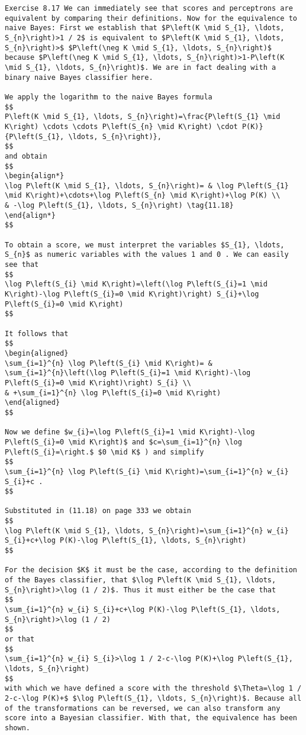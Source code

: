 \documentclass[10pt]{article}
\begin{document}
\begin{verbatim}
Exercise 8.17 We can immediately see that scores and perceptrons are equivalent by comparing their definitions. Now for the equivalence to naive Bayes: First we establish that $P\left(K \mid S_{1}, \ldots, S_{n}\right)>1 / 2$ is equivalent to $P\left(K \mid S_{1}, \ldots, S_{n}\right)>$ $P\left(\neg K \mid S_{1}, \ldots, S_{n}\right)$ because $P\left(\neg K \mid S_{1}, \ldots, S_{n}\right)>1-P\left(K \mid S_{1}, \ldots, S_{n}\right)$. We are in fact dealing with a binary naive Bayes classifier here.

We apply the logarithm to the naive Bayes formula
$$
P\left(K \mid S_{1}, \ldots, S_{n}\right)=\frac{P\left(S_{1} \mid K\right) \cdots \cdots P\left(S_{n} \mid K\right) \cdot P(K)}{P\left(S_{1}, \ldots, S_{n}\right)},
$$
and obtain
$$
\begin{align*}
\log P\left(K \mid S_{1}, \ldots, S_{n}\right)= & \log P\left(S_{1} \mid K\right)+\cdots+\log P\left(S_{n} \mid K\right)+\log P(K) \\
& -\log P\left(S_{1}, \ldots, S_{n}\right) \tag{11.18}
\end{align*}
$$

To obtain a score, we must interpret the variables $S_{1}, \ldots, S_{n}$ as numeric variables with the values 1 and 0 . We can easily see that
$$
\log P\left(S_{i} \mid K\right)=\left(\log P\left(S_{i}=1 \mid K\right)-\log P\left(S_{i}=0 \mid K\right)\right) S_{i}+\log P\left(S_{i}=0 \mid K\right)
$$

It follows that
$$
\begin{aligned}
\sum_{i=1}^{n} \log P\left(S_{i} \mid K\right)= & \sum_{i=1}^{n}\left(\log P\left(S_{i}=1 \mid K\right)-\log P\left(S_{i}=0 \mid K\right)\right) S_{i} \\
& +\sum_{i=1}^{n} \log P\left(S_{i}=0 \mid K\right)
\end{aligned}
$$

Now we define $w_{i}=\log P\left(S_{i}=1 \mid K\right)-\log P\left(S_{i}=0 \mid K\right)$ and $c=\sum_{i=1}^{n} \log P\left(S_{i}=\right.$ $0 \mid K$ ) and simplify
$$
\sum_{i=1}^{n} \log P\left(S_{i} \mid K\right)=\sum_{i=1}^{n} w_{i} S_{i}+c .
$$

Substituted in (11.18) on page 333 we obtain
$$
\log P\left(K \mid S_{1}, \ldots, S_{n}\right)=\sum_{i=1}^{n} w_{i} S_{i}+c+\log P(K)-\log P\left(S_{1}, \ldots, S_{n}\right)
$$

For the decision $K$ it must be the case, according to the definition of the Bayes classifier, that $\log P\left(K \mid S_{1}, \ldots, S_{n}\right)>\log (1 / 2)$. Thus it must either be the case that
$$
\sum_{i=1}^{n} w_{i} S_{i}+c+\log P(K)-\log P\left(S_{1}, \ldots, S_{n}\right)>\log (1 / 2)
$$
or that
$$
\sum_{i=1}^{n} w_{i} S_{i}>\log 1 / 2-c-\log P(K)+\log P\left(S_{1}, \ldots, S_{n}\right)
$$
with which we have defined a score with the threshold $\Theta=\log 1 / 2-c-\log P(K)+$ $\log P\left(S_{1}, \ldots, S_{n}\right)$. Because all of the transformations can be reversed, we can also transform any score into a Bayesian classifier. With that, the equivalence has been shown.


\end{verbatim}
\end{document}
